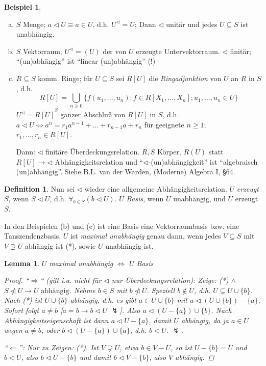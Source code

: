 \documentclass[headsepline=true,DIV=11]{scrartcl}
\newtheorem*{lemma}{Lemma}
\theoremstyle{definition}
\newtheorem*{definition}{Definition}
\newtheorem*{example}{Beispiel}
\renewcommand{\bar}[1]{\overline{#1}}
\newcommand{\nlhd}{\ntriangleleft} %
\begin{document}
\begin{example}
	\begin{enumerate}[(a)]
		\item $S$ Menge; $a\lhd U \equiv a\in U$, d.h. $U^\lhd=U$; Dann $\lhd$ unitär und jedes $U\subseteq S$ ist unabhängig.
		\item $S$ Vektorraum; $U^\lhd=(U)$ der von $U$ erzeugte Untervektorraum. $\lhd$ finitär; ``(un)abhängig'' ist ``linear (un)abhängig'' (!)
		\item $R\subseteq S$ komm. Ringe; für $U\subseteq S$ sei $R[U]$ die {\em Ringadjunktion} von $U$ an $R$ in $S$, d.h.
			\[ R[U]= \bigcup_{n\ge 0} \{ f(u_1,\ldots,u_n)\colon f\in R[X_1,\ldots,X_n]; u_1,\ldots, u_n \in U\} \]
			$U^\lhd = \bar{ R[U] }^S$ ganzer Abschluß von $R[U]$ in $S$, d.h. $a\lhd U\iff a^n = r_1a^{n-1}+\ldots+r_{n-1} a + r_n$ für geeignete $n\ge 1$; $r_1,\ldots,r_n\in R[U]$.
			
			Dann: $\lhd$ finitäre Überdeckungsrelation.
			$R, S$ Körper, $R(U)$ statt $R[U]\to \lhd$ Abhängigkeitsrelation und ``$\lhd$-(un)abhängigkeit'' ist ``algebraisch (un)abhängig''.
			Siehe B.L. van der Warden, (Moderne) Algebra I, §64.
	\end{enumerate}
\end{example}

\begin{definition}
	Nun sei $\lhd$ wieder eine allgemeine Abhängigkeitsrelation.
	$U$ {\em erzeugt} $S$, wenn $S\lhd U$, d.h. $\forall_{b\in S}(b\lhd U)$.
	$U$ {\em Basis}, wenn $U$ unabhängig, und $U$ erzeugt $S$.
	
	In den Beispielen (b) und (c) ist eine Basis eine Vektorraumbasis bzw. eine Tanszendenzbasis.
	$U$ ist {\em maximal unabhängig} genau dann, wenn jedes $V\subseteq S$ mit $V\supsetneq U$ abhängig ist (*), sowie $U$ unabhängig ist.
\end{definition}

\begin{lemma}
	$U$ maximal unabhängig $\iff$ $U$ Basis
	\begin{proof}
		``$\Rightarrow$`` (gilt i.a. nicht für $\lhd$ nur Überdeckungsrelation):
		Zeige: (*) $\land$ $S\ntriangleleft U \to U \text{ abhängig}$.
		Nehme $b\in S$ mit $b\nlhd U$.
		Speziell $b\notin U$, d.h. $U\subsetneq U\cup \{b\}$.
		Nach (*) ist $U\cup \{b\}$ abhängig, d.h. es gibt $a\in U\cup \{b\}$ mit $a\lhd (U\cup \{b\})-\{a\}$.
		Sofort folgt $a\neq b$ [$a=b\to b\lhd U$ $\lightning$].
		Also $a\lhd (U-\{a\})\cup\{b\}$.
		Nach Abhängigkeitseigenschaft ist dann $a\lhd U-\{a\}$, damit $U$ abhängig, da ja $a\in U$ wegen $a\neq b$, 
		oder $b\lhd (U-\{a\})\cup\{a\}$, d.h. $b\lhd U$. $\lightning$.

		``$\Leftarrow$'': Nur zu Zeigen: (*).
		Ist $V\supsetneq U$, etwa $b\in V-U$, so ist $U-\{b\}=U$ und $b\lhd U$, also $b\lhd U-\{b\}$ und damit $b\lhd V-\{b\}$, also $V$ abhängig.
	\end{proof}
\end{lemma}
\end{document}

